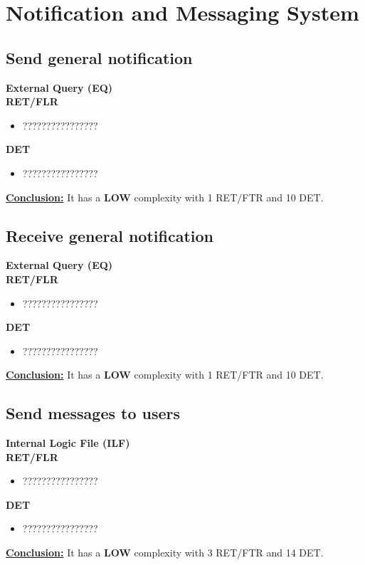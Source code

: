 \section{Notification and Messaging System}

\subsection{Send general notification}
\textbf{External Query (EQ)} \\ 
\textbf{RET/FLR}
\begin{itemize}
\item ????????????????
\end{itemize}
\textbf{DET}
\begin{itemize}
\item ????????????????
\end{itemize}
\textbf{\underline{Conclusion:}} It has a \textbf{LOW} complexity with 1 RET/FTR and 10 DET.


\subsection{Receive general notification}
\textbf{External Query (EQ)} \\ 
\textbf{RET/FLR}
\begin{itemize}
\item ????????????????
\end{itemize}
\textbf{DET}
\begin{itemize}
\item ????????????????
\end{itemize}
\textbf{\underline{Conclusion:}} It has a \textbf{LOW} complexity with 1 RET/FTR and 10 DET.

\subsection{Send messages to users}
\textbf{Internal Logic File (ILF)} \\ 
\textbf{RET/FLR}
\begin{itemize}
\item ????????????????
\end{itemize}
\textbf{DET}
\begin{itemize}
\item ????????????????
\end{itemize}
\textbf{\underline{Conclusion:}} It has a \textbf{LOW} complexity with 3 RET/FTR and 14 DET.

